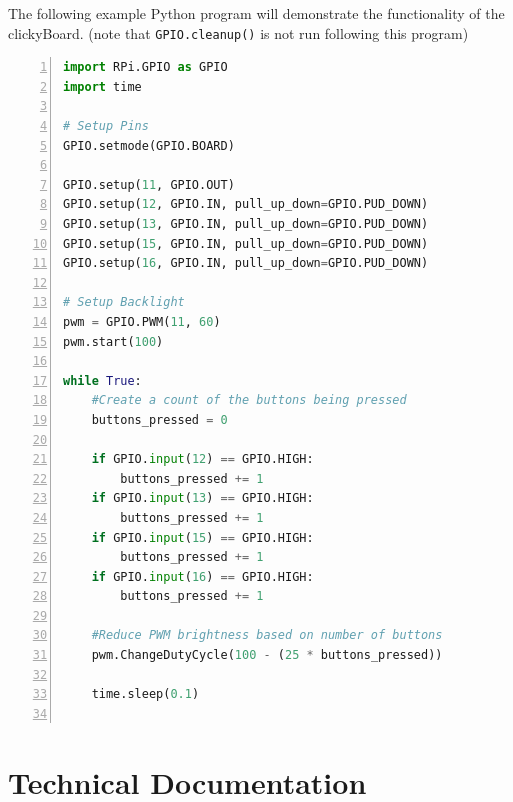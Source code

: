\documentclass[10pt, a4paper, onesided]{article}
\begin{document}
The following example Python program will demonstrate the functionality of the clickyBoard. (note that \texttt{GPIO.cleanup()} is not run following this program)

\begin{lstlisting}[language=Python,title=clickyboardtest.py,numbers=left]
import RPi.GPIO as GPIO
import time

# Setup Pins
GPIO.setmode(GPIO.BOARD)

GPIO.setup(11, GPIO.OUT)
GPIO.setup(12, GPIO.IN, pull_up_down=GPIO.PUD_DOWN)
GPIO.setup(13, GPIO.IN, pull_up_down=GPIO.PUD_DOWN)
GPIO.setup(15, GPIO.IN, pull_up_down=GPIO.PUD_DOWN)
GPIO.setup(16, GPIO.IN, pull_up_down=GPIO.PUD_DOWN)

# Setup Backlight
pwm = GPIO.PWM(11, 60)
pwm.start(100)

while True:
	#Create a count of the buttons being pressed
	buttons_pressed = 0
	
	if GPIO.input(12) == GPIO.HIGH:
		buttons_pressed += 1
	if GPIO.input(13) == GPIO.HIGH:
		buttons_pressed += 1
	if GPIO.input(15) == GPIO.HIGH:
		buttons_pressed += 1
	if GPIO.input(16) == GPIO.HIGH:
		buttons_pressed += 1
	
	#Reduce PWM brightness based on number of buttons
	pwm.ChangeDutyCycle(100 - (25 * buttons_pressed))
	
	time.sleep(0.1)
	
\end{lstlisting}

\newpage
\section{Technical Documentation}
\end{document}
